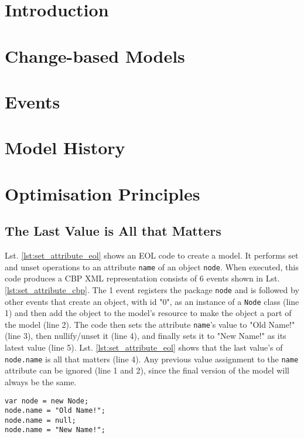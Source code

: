 \section{Introduction}

\section{Change-based Models}

\section{Events}

\section{Model History}

\section{Optimisation Principles}


\subsection{The Last Value is All that Matters}
Lst. \ref{lst:set_attribute_eol} shows an EOL code to create a model. It performs set and unset operations to an attribute \texttt{name} of an object \texttt{node}. When executed, this code produces a CBP XML representation consists of 6 events shown in Lst. \ref{lst:set_attribute_cbp}. The 1 event registers the package \texttt{node} and is followed by other events that create an object, with id "0", as an instance of a \texttt{Node} class (line 1) and then add the object to the model's resource to make the object a part of the model (line 2). The code then sets the attribute \texttt{name}'s value to "Old Name!" (line 3), then nullify/unset it (line 4), and finally sets it to "New Name!" as its latest value (line 5). Lst. \ref{lst:set_attribute_eol} shows that the last value's of \texttt{node.name} is all that matters (line 4). Any previous value assignment to the \texttt{name} attribute can be ignored (line 1 and 2), since the final version of the model will always be the same. 

\begin{lstlisting}[style=eol,caption={The EOL code for Setting  Attribute.},label=lst:set_attribute_eol]
var node = new Node;
node.name = "Old Name!";
node.name = null;
node.name = "New Name!";
\end{lstlisting}

